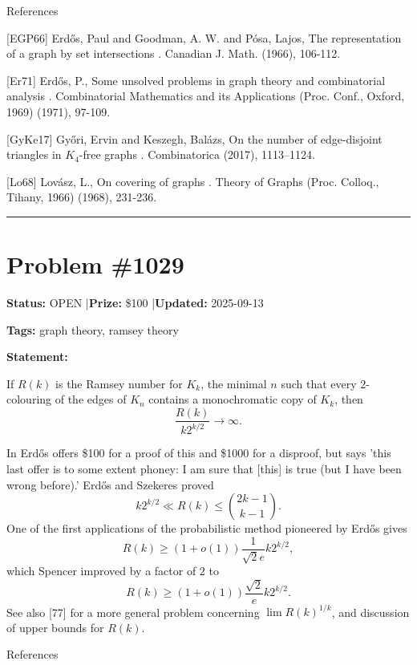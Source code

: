 \documentclass{article}
\begin{document}
References

[EGP66] Erd\H{o}s, Paul and Goodman, A. W. and P\'{o}sa, Lajos, The representation of a graph by set intersections . Canadian J. Math. (1966), 106-112.

[Er71] Erd\H{o}s, P., Some unsolved problems in graph theory and combinatorial analysis . Combinatorial Mathematics and its Applications (Proc. Conf., Oxford, 1969) (1971), 97-109.

[GyKe17] Gy\H{o}ri, Ervin and Keszegh, Bal\'{a}zs, On the number of edge-disjoint triangles in {$K_4$}-free graphs . Combinatorica (2017), 1113--1124.

[Lo68] Lov\'{a}sz, L., On covering of graphs . Theory of Graphs (Proc. Colloq., Tihany, 1966) (1968), 231-236.

\noindent\rule{\linewidth}{0.4pt}


\section{Problem \#1029}
\label{prob:1029}

\noindent\textbf{Status:} OPEN \quad|\quad \textbf{Prize:} \$100 \quad|\quad \textbf{Updated:} 2025-09-13

\noindent\textbf{Tags:} graph theory, ramsey theory

\medskip

\noindent\textbf{Statement:}

If $R(k)$ is the Ramsey number for $K_k$, the minimal $n$ such that every $2$-colouring of the edges of $K_n$ contains a monochromatic copy of $K_k$, then\[\frac{R(k)}{k2^{k/2}}\to \infty.\]




In \cite{Er93} Erd\H{o}s offers \$100 for a proof of this and \$1000 for a disproof, but says 'this last offer is to some extent phoney: I am sure that [this] is true (but I have been wrong before).' Erd\H{o}s and Szekeres \cite{ErSz35} proved\[k2^{k/2} \ll R(k) \leq \binom{2k-1}{k-1}.\]One of the first applications of the probabilistic method pioneered by Erd\H{o}s gives\[R(k) \geq (1+o(1))\frac{1}{\sqrt{2}e}k2^{k/2},\]which Spencer \cite{Sp75} improved by a factor of $2$ to\[R(k) \geq (1+o(1))\frac{\sqrt{2}}{e}k2^{k/2}.\]See also [77] for a more general problem concerning $\lim R(k)^{1/k}$, and discussion of upper bounds for $R(k)$.




References
\end{document}
